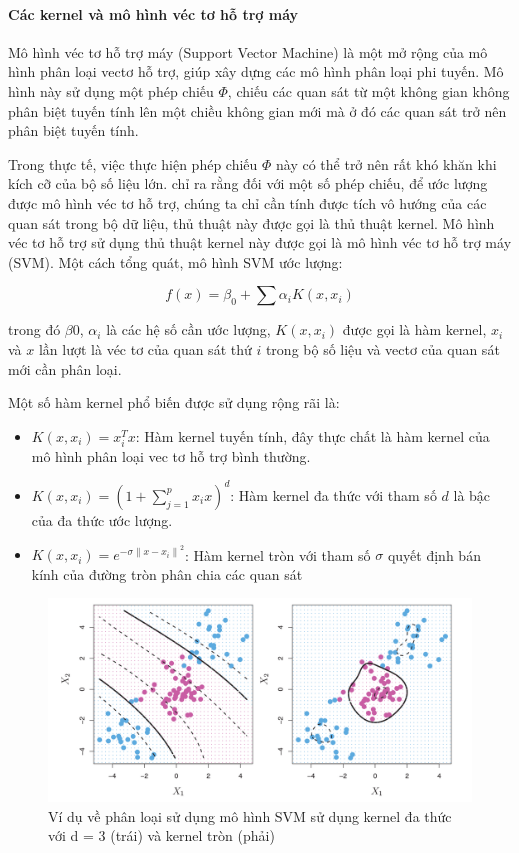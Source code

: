 \paragraph{Các kernel và mô hình véc tơ hỗ trợ máy}

Mô hình véc tơ hỗ trợ máy (Support Vector Machine) là một mở rộng của mô hình phân loại vectơ hỗ trợ, giúp xây dựng các mô hình phân loại phi tuyến. Mô hình này sử dụng một phép chiếu $\Phi$, chiếu các quan sát từ một không gian không phân biệt tuyến tính lên một chiều không gian mới mà ở đó các quan sát trở nên phân biệt tuyến tính.

Trong thực tế, việc thực hiện phép chiếu $\Phi$ này có thể trở nên rất khó khăn khi kích cỡ của bộ số liệu lớn. \textcite{scholkopf1999advances} chỉ ra rằng đối với một số phép chiếu, để ước lượng được mô hình véc tơ hỗ trợ, chúng ta chỉ cần tính được tích vô hướng của các quan sát trong bộ dữ liệu, thủ thuật này được gọi là thủ thuật kernel. Mô hình véc tơ hỗ trợ sử dụng thủ thuật kernel này được gọi là mô hình véc tơ hỗ trợ máy (SVM). Một cách tổng quát, mô hình SVM ước lượng:

$$
f(x) = \beta_0 + \sum\alpha_i K(x, x_i)
$$

trong đó $\beta0$, $\alpha_i$ là các hệ số cần ước lượng, $K(x, x_i)$ được gọi là hàm kernel, $x_i$ và $x$ lần lượt là véc tơ của quan sát thứ $i$ trong bộ số liệu và vectơ của quan sát mới cần phân loại.

Một số hàm kernel phổ biến được sử dụng rộng rãi là:

\begin{itemize}
  \item{$K(x, x_i) = x_i^T x$}: Hàm kernel tuyến tính, đây thực chất là hàm kernel của mô hình phân loại vec tơ hỗ trợ bình thường.
  \item{$K(x, x_i) =  (1 + \sum_{j = 1}^p x_i x)^d$}: Hàm kernel đa thức với tham số $d$ là bậc của đa thức ước lượng.
  \item{$K(x, x_i) = e^{-\sigma{\|x - x_i\|}^2}$}: Hàm kernel tròn với tham số $\sigma$ quyết định bán kính của đường tròn phân chia các quan sát
\end{itemize}

\begin{figure}
  \centering
    \includegraphics[width=\textwidth]{./Figures/svm_kernel_example.png}
  \caption[Ví dụ về phân loại sử dụng mô hình SVM]{Ví dụ về phân loại sử dụng mô hình SVM sử dụng kernel đa thức với d = 3 (trái) và kernel tròn (phải)}
  \label{fig:svm_kernel_example}
\end{figure}

